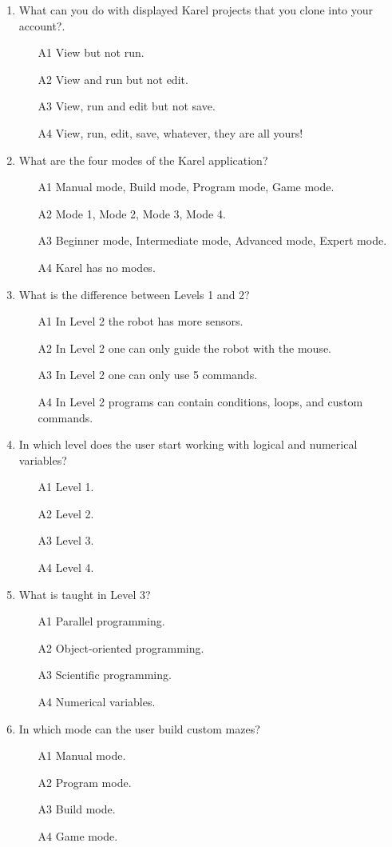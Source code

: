 \begin{enumerate}
\item What can you do with displayed Karel projects that you clone into your account?.
\begin{enumerate}
\item[A1] View but not run.
\item[A2] View and run but not edit.
\item[A3] View, run and edit but not save.
\item[A4] View, run, edit, save, whatever, they are all yours!
\end{enumerate}
\item What are the four modes of the Karel application?
\begin{enumerate}
\item[A1] Manual mode, Build mode, Program mode, Game mode.
\item[A2] Mode 1, Mode 2, Mode 3, Mode 4.
\item[A3] Beginner mode, Intermediate mode, Advanced mode, Expert mode.
\item[A4] Karel has no modes.
\end{enumerate}
\item What is the difference between Levels 1 and 2?
\begin{enumerate}
\item[A1] In Level 2 the robot has more sensors. 
\item[A2] In Level 2 one can only guide the robot with the mouse.
\item[A3] In Level 2 one can only use 5 commands.
\item[A4] In Level 2 programs can contain conditions, loops, and custom commands. 
\end{enumerate}
\item In which level does the user start working with logical and numerical variables?
\begin{enumerate}
\item[A1] Level 1.
\item[A2] Level 2.
\item[A3] Level 3.
\item[A4] Level 4.
\end{enumerate}
\item What is taught in Level 3?
\begin{enumerate}
\item[A1] Parallel programming.
\item[A2] Object-oriented programming.
\item[A3] Scientific programming.
\item[A4] Numerical variables.
\end{enumerate}
\item In which mode can the user build custom mazes?
\begin{enumerate}
\item[A1] Manual mode.
\item[A2] Program mode.
\item[A3] Build mode.
\item[A4] Game mode.
\end{enumerate}
\end{enumerate}

